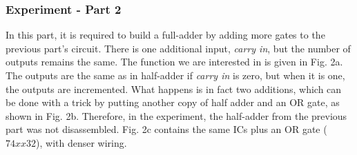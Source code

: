 \documentclass{article}
\begin{document}
\subsubsection{Experiment - Part 2}
In this part, it is required to build a full-adder by adding more gates to the previous part's circuit. There is one additional input, \emph{carry in}, but the number of outputs remains the same. The function we are interested in is given in Fig. 2a. The outputs are the same as in half-adder if \emph{carry in} is zero, but when it is one, the outputs are incremented. What happens is in fact two additions, which can be done with a trick by putting another copy of half adder and an OR gate, as shown in Fig. 2b. Therefore, in the experiment, the half-adder from the previous part was not disassembled. Fig. 2c contains the same ICs plus an OR gate ($74xx32$), with denser wiring.
\end{document}
